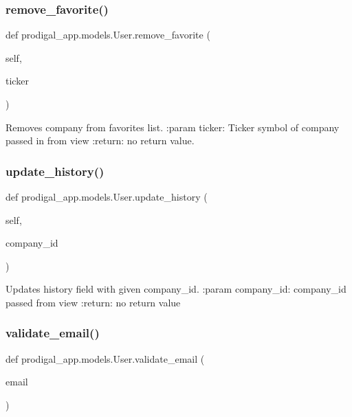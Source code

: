 \subsubsection{\texorpdfstring{remove\+\_\+favorite()}{remove\_favorite()}}
{\footnotesize\ttfamily def prodigal\+\_\+app.\+models.\+User.\+remove\+\_\+favorite (\begin{DoxyParamCaption}\item[{}]{self,  }\item[{}]{ticker }\end{DoxyParamCaption})}

\begin{DoxyVerb}Removes company from favorites list.
:param ticker: Ticker symbol of company passed in from view
:return: no return value.
\end{DoxyVerb}
 \mbox{\label{classprodigal__app_1_1models_1_1_user_a0d87aad2f6a30ac3d3aa95b4132c93ae}} 
\subsubsection{\texorpdfstring{update\+\_\+history()}{update\_history()}}
{\footnotesize\ttfamily def prodigal\+\_\+app.\+models.\+User.\+update\+\_\+history (\begin{DoxyParamCaption}\item[{}]{self,  }\item[{}]{company\+\_\+id }\end{DoxyParamCaption})}

\begin{DoxyVerb}Updates history field with given company_id.
:param company_id: company_id passed from view
:return: no return value
\end{DoxyVerb}
 \mbox{\label{classprodigal__app_1_1models_1_1_user_af782c74fbc6e55cf3d34f63e46e79cdf}} 
\subsubsection{\texorpdfstring{validate\+\_\+email()}{validate\_email()}}
{\footnotesize\ttfamily def prodigal\+\_\+app.\+models.\+User.\+validate\+\_\+email (\begin{DoxyParamCaption}\item[{}]{email }\end{DoxyParamCaption})\hspace{0.3cm}{\ttfamily [static]}}

